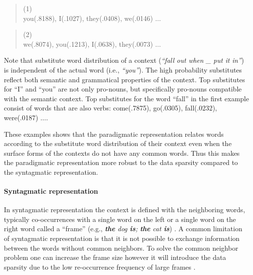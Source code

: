 \begin{quote}
  \small
  (1) \\
   you(.8188), I(.1027), they(.0408), we(.0146) $\ldots$
\end{quote}

\begin{quote}
  \small
  (2) \\
   we(.8074), you(.1213), I(.0638), they(.0073) $\ldots$
\end{quote}

Note that substitute word distribution of a context ({\it ``fall out when \_
put it in''}) is independent of the actual word (i.e., {\it ``you''}).  The
high probability substitutes reflect both semantic and grammatical properties
of the context.  Top substitutes for ``I'' and ``you'' are not only pro-nouns,
but specifically pro-nouns compatible with the semantic context.  Top
substitutes for the word ``fall'' in the first example consist of words that
are also verbs: come(.7875), go(.0305), fall(.0232), were(.0187) $\ldots$.

These examples shows that the paradigmatic representation relates words according
to the substitute word distribution of their context even when the surface
forms of the contexts do not have any common words.  Thus this makes the
paradigmatic representation more robust to the data sparsity compared to the
syntagmatic representation.



\paragraph {Syntagmatic representation} 
In syntagmatic representation the context is defined with the neighboring
words, typically co-occurrences with a single word on the left or a single word
on the right word called a ``frame'' (e.g., {\em {\bf the} dog {\bf is}; {\bf
the} cat {\bf is}})
\citep*{SchutzePe93,Redington98distributionalinformation, Mintz200391,clair2010,lamar-EtAl:2010:Short,maron2010sphere}. A common limitation of syntagmatic representation is that
it is not possible to exchange information between the words without common
neighbors.  To solve the common neighbor problem one can increase the frame
size however it will introduce the data sparsity due to the low re-occurrence
frequency of large frames \citep*{manning99foundations}.

